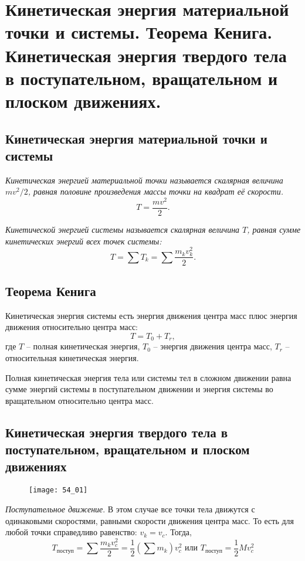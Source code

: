 \chapter{Кинетическая энергия материальной точки и системы. Теорема Кенига.
Кинетическая энергия твердого тела в поступательном, вращательном и плоском
движениях.}

\section{Кинетическая энергия материальной точки и системы}

\emph{Кинетическая энергией материальной точки называется 
скалярная величина \( mv^2/2 \), равная половине произведения 
массы точки на квадрат её скорости.}
\[
	T = \frac{mv^2}{2}.
\]

\emph{Кинетической энергией системы называется скалярная величина 
\( T \), равная сумме кинетических энергий всех точек системы:}
\[
	T = \sum T_k = \sum\frac{m_k v^2_k}{2}.
\]

\section{Теорема Кенига}
Кинетическая энергия системы есть энергия движения центра масс плюс энергия 
движения относительно центра масс:
\[
	T = T_0 + T_r,
\]
где \( T \) -- полная кинетическая энергия, \( T_0 \) -- энергия движения 
центра масс, \( T_r \) -- относительная кинетическая энергия.

Полная кинетическая энергия тела или системы тел в сложном движении равна 
сумме энергий системы в поступательном движении и энергия системы во 
вращательном относительно центра масс.

\section{Кинетическая энергия твердого тела в поступательном, вращательном 
и плоском движениях}

\begin{figure}[h!]
	\center
    \texttt{[image: 54\_01]}
    \caption{}
    \label{pic54_01}
\end{figure}

\emph{Поступательное движение}. В этом случае все точки тела движутся 
с одинаковыми скоростями, равными скорости движения центра масс. То есть 
для любой точки справедливо равенство: \( v_k = v_c \). Тогда, 
\[ 
	T_{\text{поступ}} = \sum\frac{m_k v^2_c}{2} = 
	\frac{1}{2}\left( \sum m_k \right)v^2_c
	\text{ или }
	T_{\text{поступ}} = \frac{1}{2}Mv^2_c
\]

